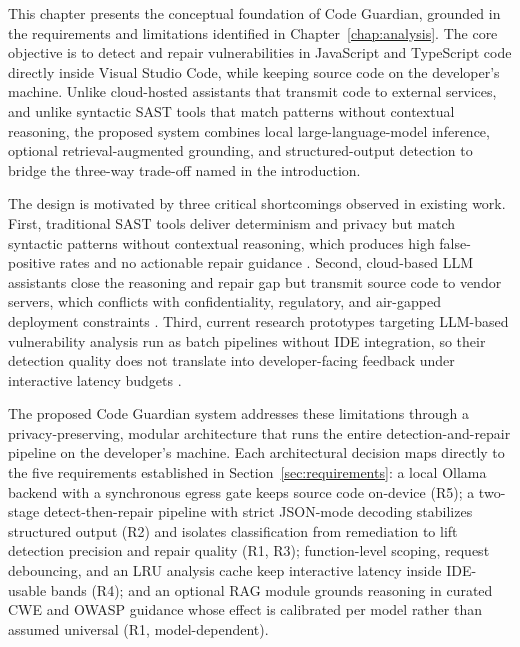 This chapter presents the conceptual foundation of Code Guardian, grounded in the requirements and limitations identified in Chapter~\ref{chap:analysis}. The core objective is to detect and repair vulnerabilities in JavaScript and TypeScript code directly inside Visual Studio Code, while keeping source code on the developer's machine. Unlike cloud-hosted assistants that transmit code to external services, and unlike syntactic SAST tools that match patterns without contextual reasoning, the proposed system combines local large-language-model inference, optional retrieval-augmented grounding, and structured-output detection to bridge the three-way trade-off named in the introduction.

The design is motivated by three critical shortcomings observed in existing work. First, traditional SAST tools deliver determinism and privacy but match syntactic patterns without contextual reasoning, which produces high false-positive rates and no actionable repair guidance \cite{johnson2013don,christakis2016developers}. Second, cloud-based LLM assistants close the reasoning and repair gap but transmit source code to vendor servers, which conflicts with confidentiality, regulatory, and air-gapped deployment constraints \cite{carlini2021extracting,gdpr2016}. Third, current research prototypes targeting LLM-based vulnerability analysis run as batch pipelines without IDE integration, so their detection quality does not translate into developer-facing feedback under interactive latency budgets \cite{li2025iris,islam2024secrepair}.

The proposed Code Guardian system addresses these limitations through a privacy-preserving, modular architecture that runs the entire detection-and-repair pipeline on the developer's machine. Each architectural decision maps directly to the five requirements established in Section~\ref{sec:requirements}: a local Ollama backend with a synchronous egress gate keeps source code on-device (R5); a two-stage detect-then-repair pipeline with strict JSON-mode decoding stabilizes structured output (R2) and isolates classification from remediation to lift detection precision and repair quality (R1, R3); function-level scoping, request debouncing, and an LRU analysis cache keep interactive latency inside IDE-usable bands (R4); and an optional RAG module grounds reasoning in curated CWE and OWASP guidance whose effect is calibrated per model rather than assumed universal (R1, model-dependent).


